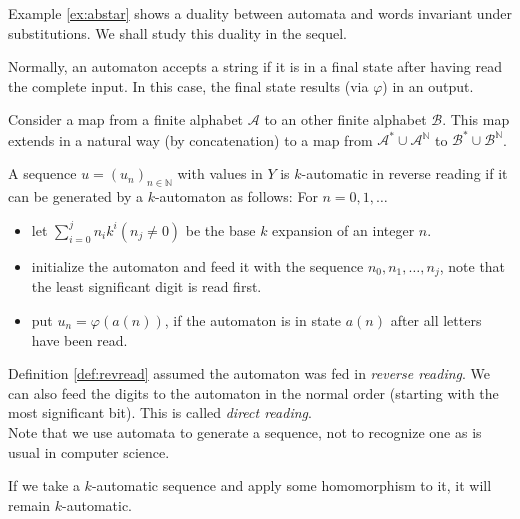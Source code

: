 \documentclass{article}
\begin{document}
Example \ref{ex:abstar} shows a duality between automata and words invariant 
under substitutions. We shall study this duality in the sequel.

\begin{remark} \label{rem:output}
Normally, an automaton accepts a string if it is in
a final state after having read the complete input. In this case, the final 
state results (via $\varphi$) in an output.
\end{remark}

\begin{definition} \label{def:ltol}
Consider a map from a finite alphabet $\mathcal{A}$ to an other finite alphabet
$\mathcal{B}$. This map extends in a natural way (by concatenation) to a map 
from $\mathcal{A}^* \cup \mathcal{A}^\mathbb{N}$ to
$\mathcal{B}^* \cup \mathcal{B}^\mathbb{N}$.
\end{definition}

\begin{definition} \label{def:revread}
A sequence $u = (u_n)_{n \in \mathbb{N}}$ with values in $Y$ is $k$-automatic 
in reverse reading if it can be generated by a $k$-automaton as follows: For 
$n = 0, 1, \ldots$
\begin{itemize}
\item let $\sum_{i=0}^j n_i k^i (n_j \neq 0)$ be the base $k$ expansion of an
      integer $n$.
\item initialize the automaton and feed it with the sequence 
      $n_0, n_1, \ldots, n_j$, note that the least significant digit is read 
      first.
\item put $u_n = \varphi(a(n))$, if the automaton is in state $a(n)$ after all
      letters have been read.
\end{itemize}
\end{definition}

Definition \ref{def:revread} assumed the automaton was fed in 
\emph{reverse reading}. We can also feed the digits to the automaton in the 
normal order (starting with the most significant bit). This is called 
\emph{direct reading}.\\
Note that we use automata to generate a sequence, not to recognize one as is
usual in computer science.

\begin{theorem} \label{thm:homomorph}
If we take a $k$-automatic sequence and apply some homomorphism to it, it will 
remain $k$-automatic.
\end{theorem}
\end{document}
